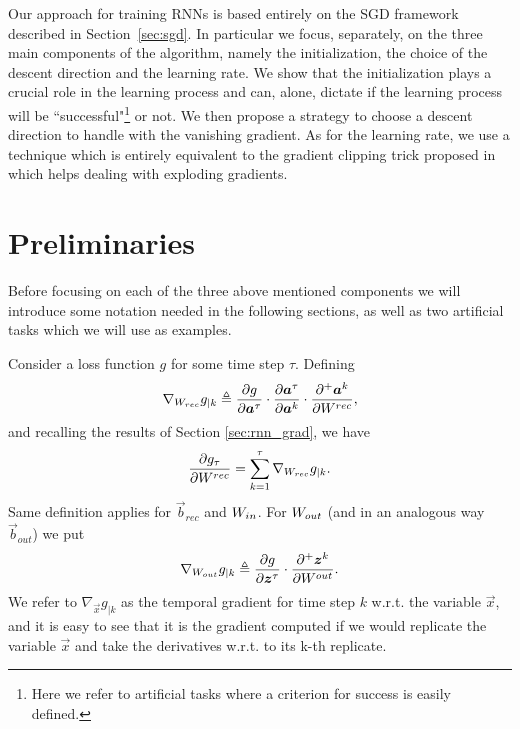 Our approach for training RNNs is based entirely on the SGD framework described in Section~\ref{sec:sgd}. In particular we focus, separately, on the three main components of the algorithm, namely the initialization, the choice of the descent direction and the learning rate. We show that the initialization plays a crucial role in the learning process and can, alone, dictate if the learning process will be ``successful"\footnote{Here we refer to artificial tasks where a criterion for success is easily defined.} or not. We then propose a strategy to choose a descent direction to handle with the vanishing gradient. As for the learning rate, we use a technique which is entirely equivalent to the gradient clipping trick proposed in \cite{understandingExplodingGradients} which helps dealing with exploding gradients.


\section{Preliminaries}
Before focusing on each of the three above mentioned components we will introduce some notation needed in the following sections, as well as two artificial tasks which we will use as examples.

Consider a loss function $g$ for some time step $\tau$. Defining 
\begin{equation}
\nabla_{W_{rec}} g_{|k}  \triangleq \frac{\partial g}{\partial \boldsymbol{a}^{\tau}} \cdot \frac{\partial \boldsymbol{a}^{\tau}}{\partial \boldsymbol{a}^k} \cdot \frac{\partial^+ \boldsymbol{a}^k}{\partial W^{rec}},
\end{equation}
and recalling the results of Section \ref{sec:rnn_grad}, we have
\begin{equation}
	\frac{\partial g_{\tau}}{\partial W^{rec}} = \sum_{k=1}^{\tau} \nabla_{W_{rec}} g_{|k}.
\end{equation}
Same definition applies for $\vec{b}_{rec}$ and $W_{in}$. For $W_{out}$ (and in an analogous way $\vec{b}_{out}$) we put
\begin{equation}
\nabla_{W_{out}} g_{|k}  \triangleq \frac{\partial g}{\partial \boldsymbol{z}^{\tau}} \cdot \frac{\partial^+ \boldsymbol{z}^k}{\partial W^{out}}.
\end{equation}
We refer to $\nabla_{\vec{x}} g_{|k}$ as the temporal gradient for time step $k$ w.r.t. the variable $\vec{x}$, and it is easy to see that it is the gradient computed if we would replicate the variable $\vec{x}$  and take the derivatives w.r.t. to its k-th replicate.

